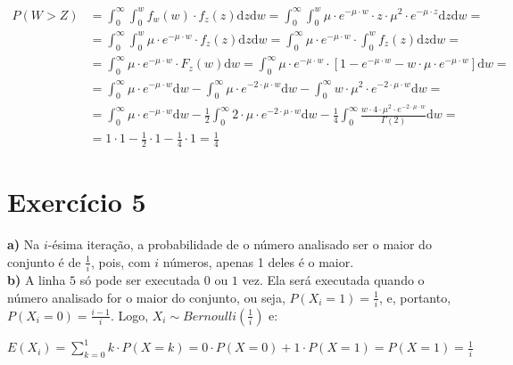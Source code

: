 \documentclass[12pt,letterpaper]{article}
\begin{document}
	\begin{equation*}
		\begin{split}
			P(W>Z) & = \int_{0}^{\infty} \int_{0}^{w} f_w(w) \cdot f_z(z) \text{d}z \text{d}w = \int_{0}^{\infty} \int_{0}^{w} \mu \cdot e^{-\mu \cdot w} \cdot z \cdot \mu^2 \cdot e^{-\mu \cdot z} \text{d}z \text{d}w = \\
			& = \int_{0}^{\infty} \int_{0}^{w} \mu \cdot e^{-\mu \cdot w} \cdot f_z(z) \text{d}z \text{d}w = \int_{0}^{\infty} \mu \cdot e^{-\mu \cdot w} \cdot \int_{0}^{w} f_z(z) \text{d}z \text{d}w = \\
			& = \int_{0}^{\infty} \mu \cdot e^{-\mu \cdot w} \cdot F_z(w) \text{d}w = \int_{0}^{\infty} \mu \cdot e^{-\mu \cdot w} \cdot [1 -e^{-\mu \cdot w} - w \cdot \mu \cdot e^{-\mu \cdot w} ] \text{d}w = \\
			& = \int_{0}^{\infty} \mu \cdot e^{-\mu \cdot w} \text{d}w - \int_{0}^{\infty} \mu \cdot e^{-2 \cdot\mu \cdot w} \text{d}w - \int_{0}^{\infty} w \cdot \mu^2 \cdot e^{-2 \cdot \mu \cdot w} \text{d}w  = \\
			& = \int_{0}^{\infty} \mu \cdot e^{-\mu \cdot w} \text{d}w - \frac{1}{2} \int_{0}^{\infty} 2\cdot \mu \cdot e^{-2 \cdot\mu \cdot w} \text{d}w - \frac{1}{4}\int_{0}^{\infty} \frac{w \cdot 4 \cdot \mu^2 \cdot e^{-2 \cdot \mu \cdot w}}{\Gamma(2)} \text{d}w = \\
			& = 1 \cdot 1 - \frac{1}{2} \cdot 1 - \frac{1}{4} \cdot 1 = \frac{1}{4}
		\end{split}
	\end{equation*}
	
	\section*{Exercício 5}
	
	\textbf{a)} Na $i$-ésima iteração, a probabilidade de o número analisado ser o maior do conjunto é de $\frac{1}{i}$, pois, com $i$ números, apenas 1 deles é o maior. \\
	
	\textbf{b)} A linha $5$ só pode ser executada $0$ ou $1$ vez. Ela será executada quando o número analisado for o maior do conjunto, ou seja, $P(X_i = 1) = \frac{1}{i}$, e, portanto, $P(X_i = 0) = \frac{i-1}{i}$. Logo, $X_i\sim Bernoulli(\frac{1}{i})$ e:
	
	\begin{center}
		$E(X_i) = \sum_{k=0}^{1} k \cdot P(X=k) = 0 \cdot P(X=0) + 1 \cdot P(X=1) = P(X=1) = \frac{1}{i}$
	\end{center}
	
\end{document}
